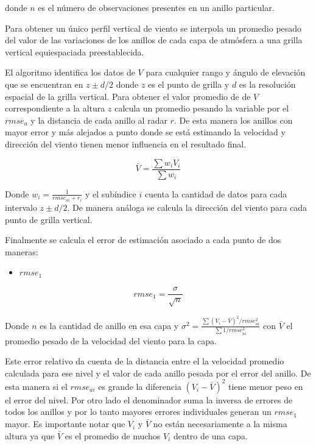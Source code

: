 \documentclass[12pt,spanish,oneside]{book}
\providecommand{\tightlist}{%
  \setlength{\itemsep}{0pt}\setlength{\parskip}{0pt}}
\begin{document}
donde \(n\) es el número de observaciones presentes en un anillo
particular.

Para obtener un único perfil vertical de viento se interpola un promedio
pesado del valor de las variaciones de los anillos de cada capa de
atmósfera a una grilla vertical equiespaciada preestablecida.

El algoritmo identifica los datos de \(V\) para cualquier rango y ángulo
de elevación que se encuentran en \(z \pm d/2\) donde \(z\) es el punto
de grilla y \(d\) es la resolución espacial de la grilla vertical. Para
obtener el valor promedio de de \(V\) correspondiente a la altura \(z\)
calcula un promedio pesando la variable por el \(rmse_a\) y la distancia
de cada anillo al radar \(r\). De esta manera los anillos con mayor
error y más alejados a punto donde se está estimando la velocidad y
dirección del viento tienen menor influencia en el resultado final.

\begin{equation}\label{eq-vr9}
\bar{V} = \frac {\sum w_i V_i} {\sum w_i}
\end{equation}

Donde \(w_i = \frac {1}{rmse_{ai} + r_i}\) y el subíndice \(i\) cuenta
la cantidad de datos para cada intervalo \(z \pm d/2\). De manera
análoga se calcula la dirección del viento para cada punto de grilla
vertical.

Finalmente se calcula el error de estimación asociado a cada punto de
dos maneras:

\begin{itemize}
\tightlist
\item
  \textbf{\(rmse_1\)}
\end{itemize}

\begin{equation}\label{eq-vr10} 
rmse_1 = \frac{\sigma}{\sqrt{n}}
\end{equation}

Donde \(n\) es la cantidad de anillo en esa capa y
\(\sigma^{2}= \frac{\sum (V_i - \bar{V})^2 /rmse_{ai}^2}{\sum 1/rmse_{ai}^2}\)
con \(\bar{V}\) el promedio pesado de la velocidad del viento para la
capa.

Este error relativo da cuenta de la distancia entre el la velocidad
promedio calculada para ese nivel y el valor de cada anillo pesada por
el error del anillo. De esta manera si el \(rmse_{ai}\) es grande la
diferencia \((V_i - \bar{V})^2\) tiene menor peso en el error del nivel.
Por otro lado el denominador suma la inversa de errores de todos los
anillos y por lo tanto mayores errores individuales generan un
\(rmse_1\) mayor. Es importante notar que \(V_i\) y \(\bar{V}\) no están
necesariamente a la misma altura ya que \(\bar{V}\) es el promedio de
muchos \(V_i\) dentro de una capa.
\end{document}
